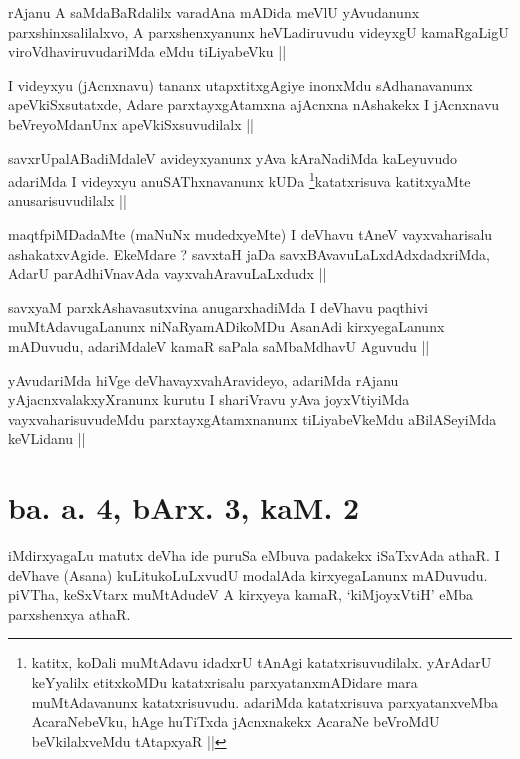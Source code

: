 \begin{artha}
rAjanu A saMdaBaRdalilx varadAna mADida meVlU yAvudanunx parxshinxsalilalxvo, A parxshenxyanunx heVLadiruvudu videyxgU kamaRgaLigU viroVdhaviruvudariMda eMdu tiLiyabeVku ||
\end{artha}

\begin{artha}
I videyxyu (jAcnxnavu) tananx utapxtitxgAgiye inonxMdu sAdhanavanunx apeVkiSxsutatxde, Adare parxtayxgAtamxna ajAcnxna nAshakekx I jAcnxnavu beVreyoMdanUnx apeVkiSxsuvudilalx ||
\end{artha}

\begin{artha}
savxrUpalABadiMdaleV avideyxyanunx yAva kAraNadiMda kaLeyuvudo adariMda I videyxyu anuSAThxnavanunx kUDa \footnote{katitx, koDali muMtAdavu idadxrU tAnAgi katatxrisuvudilalx. yArAdarU keYyalilx etitxkoMDu katatxrisalu parxyatanxmADidare mara muMtAdavanunx katatxrisuvudu. adariMda katatxrisuva parxyatanxveMba AcaraNebeVku, hAge huTiTxda jAcnxnakekx AcaraNe beVroMdU beVkilalxveMdu tAtapxyaR ||}katatxrisuva katitxyaMte anusarisuvudilalx ||
\end{artha}


\begin{artha}
maqtfpiMDadaMte (maNuNx mudedxyeMte) I deVhavu tAneV vayxvaharisalu ashakatxvAgide. EkeMdare ? savxtaH jaDa savxBAvavuLaLxdAdxdadxriMda, AdarU parAdhiVnavAda vayxvahAravuLaLxdudx ||
\end{artha}

\begin{artha}
savxyaM parxkAshavasutxvina anugarxhadiMda I deVhavu paqthivi muMtAdavugaLanunx niNaRyamADikoMDu AsanAdi kirxyegaLanunx mADuvudu, adariMdaleV kamaR saPala saMbaMdhavU Aguvudu ||
\end{artha}

\begin{artha}
yAvudariMda hiVge deVhavayxvahAravideyo, adariMda rAjanu yAjacnxvalakxyXranunx kurutu I shariVravu yAva joyxVtiyiMda vayxvaharisuvudeMdu parxtayxgAtamxnanunx tiLiyabeVkeMdu aBilASeyiMda keVLidanu ||
\end{artha}

\section*{ba. a. 4, bArx. 3, kaM. 2}

\begin{artha}
iMdirxyagaLu matutx deVha ide puruSa eMbuva padakekx iSaTxvAda athaR. I deVhave (Asana) kuLitukoLuLxvudU modalAda kirxyegaLanunx mADuvudu. piVTha, keSxVtarx muMtAdudeV A kirxyeya kamaR, `kiMjoyxVtiH' eMba parxshenxya athaR.
\end{artha}

